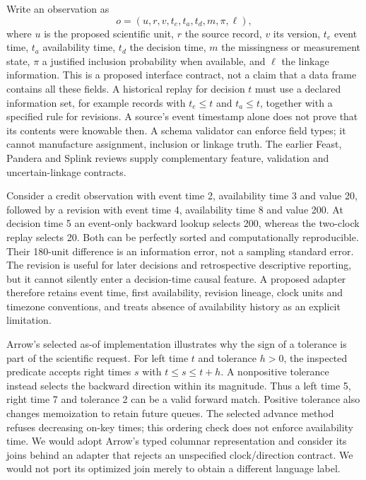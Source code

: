 Write an observation as
\[
 o=(u,r,v,t_e,t_a,t_d,m,\pi,\ell),
\]
where $u$ is the proposed scientific unit, $r$ the source record, $v$ its version, $t_e$ event time, $t_a$ availability time, $t_d$ the decision time, $m$ the missingness or measurement state, $\pi$ a justified inclusion probability when available, and $\ell$ the linkage information. This is a proposed interface contract, not a claim that a data frame contains all these fields. A historical replay for decision $t$ must use a declared information set, for example records with $t_e\leq t$ and $t_a\leq t$, together with a specified rule for revisions. A source's event timestamp alone does not prove that its contents were knowable then. A schema validator can enforce field types; it cannot manufacture assignment, inclusion or linkage truth. The earlier Feast, Pandera and Splink reviews supply complementary feature, validation and uncertain-linkage contracts.~\citep{exec19_feast_source,exec19_feast_reference,exec24_pandera_source,exec24_pandera_reference,exec24_splink_sources,exec24_splink_contract,exec25_dww_choice}

Consider a credit observation with event time 2, availability time 3 and value 20, followed by a revision with event time 4, availability time 8 and value 200. At decision time 5 an event-only backward lookup selects 200, whereas the two-clock replay selects 20. Both can be perfectly sorted and computationally reproducible. Their 180-unit difference is an information error, not a sampling standard error. The revision is useful for later decisions and retrospective descriptive reporting, but it cannot silently enter a decision-time causal feature. A proposed adapter therefore retains event time, first availability, revision lineage, clock units and timezone conventions, and treats absence of availability history as an explicit limitation.~\citep{exec25_dww_choice}

Arrow's selected as-of implementation illustrates why the sign of a tolerance is part of the scientific request. For left time $t$ and tolerance $h>0$, the inspected predicate accepts right times $s$ with $t\leq s\leq t+h$. A nonpositive tolerance instead selects the backward direction within its magnitude. Thus a left time 5, right time 7 and tolerance 2 can be a valid forward match. Positive tolerance also changes memoization to retain future queues. The selected advance method refuses decreasing on-key times; this ordering check does not enforce availability time. We would adopt Arrow's typed columnar representation and consider its joins behind an adapter that rejects an unspecified clock/direction contract. We would not port its optimized join merely to obtain a different language label.~\citep{exec25_dww_arrow,exec25_dww_choice}

